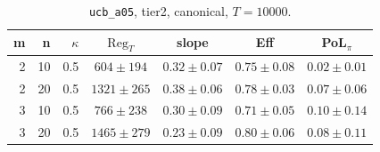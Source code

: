 \begin{table}[htbp]
\centering
\scriptsize
\caption{\texttt{ucb\_a05}, tier2, canonical, $T=10000$.}
\label{tab:tier2_long_ucb_a05}
\begin{tabular}{@{}rrrcccc@{}}
\toprule
m & n & $\kappa$ & $\mathrm{Reg}_T$ & slope & Eff & PoL$_\pi$ \\
\midrule
2 & 10 & 0.5 & $604 \pm 194$ & $0.32 \pm 0.07$ & $0.75 \pm 0.08$ & $0.02 \pm 0.01$ \\
2 & 20 & 0.5 & $1321 \pm 265$ & $0.38 \pm 0.06$ & $0.78 \pm 0.03$ & $0.07 \pm 0.06$ \\
\midrule
3 & 10 & 0.5 & $766 \pm 238$ & $0.30 \pm 0.09$ & $0.71 \pm 0.05$ & $0.10 \pm 0.14$ \\
3 & 20 & 0.5 & $1465 \pm 279$ & $0.23 \pm 0.09$ & $0.80 \pm 0.06$ & $0.08 \pm 0.11$ \\
\bottomrule
\end{tabular}
\end{table}
